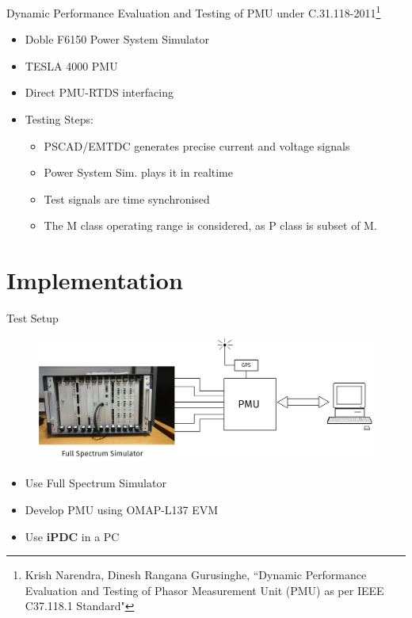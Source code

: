 \documentclass{beamer}
\begin{document}
\begin{frame}{{Dynamic Performance Evaluation and Testing of PMU under C.31.118-2011}\footnote{\tiny Krish Narendra, Dinesh Rangana Gurusinghe, ``Dynamic Performance Evaluation and Testing of Phasor Measurement Unit (PMU) as per IEEE C37.118.1 Standard"}}
\begin{itemize}
\item Doble F6150 Power System Simulator
\item TESLA 4000 PMU
\item Direct PMU-RTDS interfacing
\item Testing Steps:
\begin{itemize}
	\item PSCAD/EMTDC generates precise current and voltage signals
	\item Power System Sim. plays it in realtime
	\item Test signals are time synchronised
	\item The M class operating range is considered, as P class is subset of M. 
\end{itemize}
\end{itemize}
\end{frame}

\section{Implementation}
\begin{frame}{Test Setup}
\begin{figure}
\includegraphics[width=\textwidth]{Test_setup.png}
\end{figure}
\begin{itemize}
\item Use Full Spectrum Simulator 
\item Develop PMU using OMAP-L137 EVM
\item Use \textbf{iPDC} in a PC
\end{itemize}
\end{frame}
\end{document}

